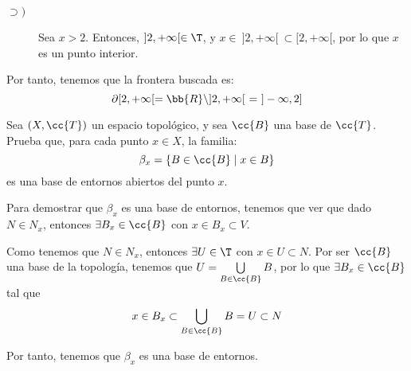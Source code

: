 \begin{ejercicio}
\begin{enumerate}[label=\alph*)]
\begin{description}
            \item[$\supset)$] Sea $x>2$. Entonces, $]2,+\infty[\in \T$, y $x\in~]2,+\infty[~\subset [2,+\infty[$, por lo que $x$ es un punto interior.
        \end{description}

        Por tanto, tenemos que la frontera buscada es:
        \begin{equation*}
            \partial [2,+\infty[ = \bb{R}\setminus ]2,+\infty[ ~=~]-\infty, 2]
        \end{equation*}
    \end{enumerate}
\end{ejercicio}


\begin{ejercicio}\label{Ej:3.1.18}
    Sea $(X,\cc{T})$ un espacio topológico, y sea $\cc{B}$ una base de $\cc{T}$. Prueba que, para cada punto $x\in X$, la familia:
    \begin{equation*}
        \beta_x = \{B\in \cc{B}\mid x \in B\}
    \end{equation*}
    es una base de entornos abiertos del punto $x$.

    Para demostrar que $\beta_x$ es una base de entornos, tenemos que ver que dado $N\in N_x$, entonces $\exists B_x\in \cc{B}$ con $x\in B_x\subset V$.

    Como tenemos que $N\in N_x$, entonces $\exists U\in  \T$ con $x\in U\subset N$. Por ser $\cc{B}$ una base de la topología, tenemos que $U=\bigcup\limits_{B\in \cc{B}}B$, por lo que $\exists B_x\in \cc{B}$ tal que $$x\in B_x\subset \bigcup\limits_{B\in \cc{B}}B=U\subset N$$

    Por tanto, tenemos que $\beta_x$ es una base de entornos.
\end{ejercicio}


